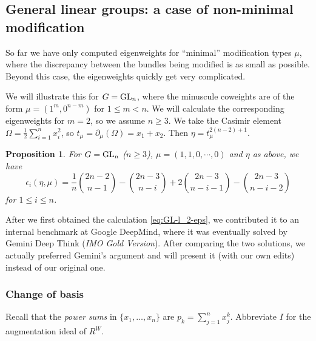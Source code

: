 \documentclass[reqno]{amsart}
\numberwithin{equation}{subsection}
\newtheorem{prop}[subsubsection]{Proposition}
\theoremstyle{definition}
\newcommand\GL{\textup{GL}}
\newcommand{\e}{\epsilon}
\begin{document}
\subsection{General linear groups: a case of non-minimal modification} So far we have only computed eigenweights for ``minimal'' modification types $\mu$, where the discrepancy between the bundles being modified is as small as possible. Beyond this case, the eigenweights quickly get very complicated. 

We will illustrate this for $G = \GL_n$, where the minuscule coweights are of the form $\mu=(1^m, 0^{n-m})$ for $1 \leq m < n$. We will calculate the corresponding eigenweights for $m=2$, so we assume $n\geq 3$. We take the Casimir element $\Omega = \frac{1}{2}\sum_{i=1}^n x_i^2$, so $t_\mu = \partial_\mu (\Omega) = x_1+x_2$. Then $\eta = t_{\mu}^{2(n-2)+1}$. 


\begin{prop}\label{prop: GL len=2}
For $G = \GL_n$ ($n\geq 3$), $\mu=(1,1,0,\cdots, 0)$ and $\eta$ as above, we have 
\begin{equation}\label{eq:GL-l_2-eps}
\e_{i}(\eta, \mu)=\frac{1}{n}\binom{2n-2}{n-1}-\binom{2n-3}{n-i}+2\binom{2n-3}{n-i-1}-\binom{2n-3}{n-i-2}
\end{equation}
for $1\leq i\leq n$.
\end{prop}

After we first obtained the calculation \eqref{eq:GL-l_2-eps}, we contributed it to an internal benchmark at Google DeepMind, where it was eventually solved by Gemini Deep Think (\emph{IMO Gold Version}). After comparing the two solutions, we actually preferred Gemini's argument and will present it (with our own edits) instead of our original one. 

\subsubsection{Change of basis}
Recall that the \emph{power sums} in $\{x_1, \ldots, x_n\}$ are $p_k = \sum_{j=1}^n x_j^k$. Abbreviate $I$ for the augmentation ideal of $R^W$. 
\end{document}
